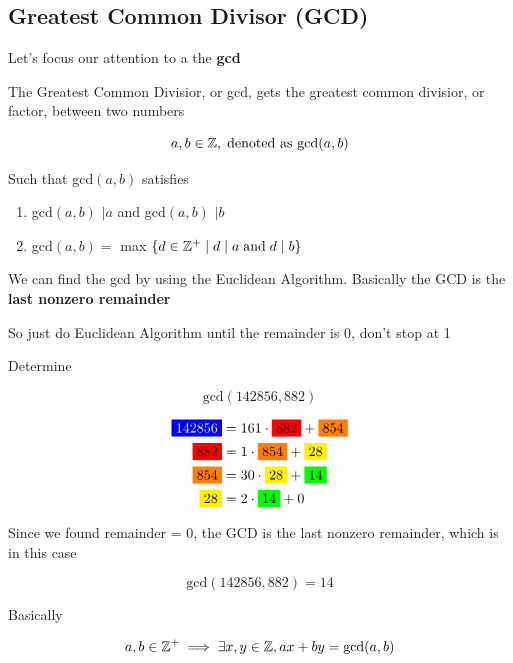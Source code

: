 \documentclass[../../Main.tex]{subfiles}
\begin{document}
\subsection{Greatest Common Divisor (GCD)}

Let's focus our attention to a the \textbf{gcd}

\begin{definition}
    The Greatest Common Divisior, or gcd, gets the greatest common divisior, or factor, between two numbers

    $$a, b \in \mathbb{Z}, \; \text{denoted as gcd} (a, b)$$

    Such that gcd$(a,b)$ satisfies

    \begin{enumerate}
        \item gcd$(a,b)$ $\mid a$ and gcd$(a,b)$ $\mid b$
        \item gcd$(a,b) = $ max $\{d \in \mathbb{Z}^+ \mid d \mid a \; \text{and} \; d \mid b\}$ 
    \end{enumerate}

    We can find the gcd by using the Euclidean Algorithm. Basically the GCD is the \textbf{last nonzero remainder}

    So just do Euclidean Algorithm until the remainder is 0, don't stop at 1
\end{definition}

\begin{example}
    Determine 

    $$\text{gcd}(142856, 882)$$

    \begin{align*}
        \bluebox{142856} &= 161 \cdot \redbox{882} + \orangebox{854} \\
        \redbox{882} &= 1 \cdot \orangebox{854} + \yellowbox{28} \\
        \orangebox{854} &= 30 \cdot \yellowbox{28} + \greenbox{14} \\
        \yellowbox{28} &= 2 \cdot \greenbox{14} + 0 \\
    \end{align*}

    Since we found remainder = 0, the GCD is the last nonzero remainder, which is  in this case

    $$\boxed{\text{gcd}(142856, 882) = 14}$$
\end{example}

\begin{theorem}

    Basically

    $$a, b \in \mathbb{Z}^+ \implies \exists x, y \in \mathbb{Z}, ax + by = \text{gcd}(a, b)$$
\end{theorem}
\end{document}
